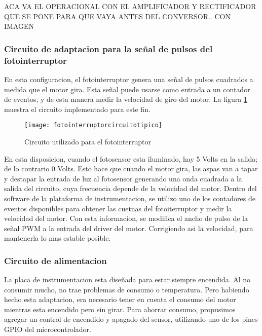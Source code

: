 ACA VA EL OPERACIONAL CON EL AMPLIFICADOR Y RECTIFICADOR QUE SE PONE PARA QUE VAYA ANTES DEL CONVERSOR.. CON IMAGEN




\subsubsection{Circuito de adaptacion para la señal de pulsos del fotointerruptor} %
\label{it6:ssub:circuito_de_adaptacion_para_la_señal_de_pulsos_del_fotointerruptor}


En esta configuracion, el fotointerruptor genera una señal de pulsos cuadrados a medida que el motor gira. Esta señal puede usarse como entrada a un contador de eventos, y de esta manera medir la velocidad de giro del motor. La figura \ref{fig:fotointerruptorcircuitotipico} muestra el circuito implementado para este fin. 

\begin{figure}[h]
  \centering
  \texttt{[image: fotointerruptorcircuitotipico]}
  \caption{Circuito utilizado para el fotointerruptor}\label{fig:fotointerruptorcircuitotipico}
\end{figure}

En esta disposicion, cuando el fotosensor esta iluminado, hay 5 Volts en la salida; de lo contrario 0 Volts. Esto hace que cuando el motor gira, las aspas van a tapar y destapar la entrada de luz al fotosensor generando una onda cuadrada a la salida del circuito, cuya frecuencia depende de la velocidad del motor. Dentro del software de la plataforma de instrumentacion, se utilizo uno de los contadores de eventos disponibles para obtener las cuetnas del fotoiterruptor y medir la velocidad del motor. Con esta informacion, se modifica el ancho de pulso de la señal PWM a la entrada del driver del motor. Corrigiendo asi la velocidad, para mantenerla lo mas estable posible. 


\subsubsection{Circuito de alimentacion} %
\label{it6:ssub:circuito_de_alimentacion}

La placa de instrumentacion esta diseñada para estar siempre encendida. Al no consumir mucho, no trae problemas de consumo o temperatura. Pero habiendo hecho esta adaptacion, era necesario tener en cuenta el consumo del motor mientras esta encendido pero sin girar. Para ahorrar consumo, propusimos agregar un control de encendido y apagado del sensor, utilizando uno de los pines GPIO del microcontrolador. \\

